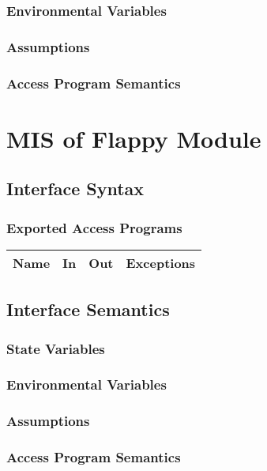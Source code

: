 \documentclass[12pt, titlepage]{article}
\begin{document}
		\subsubsection{Environmental Variables}
		\subsubsection{Assumptions}
		\subsubsection{Access Program Semantics}


\section{MIS of Flappy Module}
	\subsection{Interface Syntax}
		\subsubsection{Exported Access Programs}
		
	\begin{tabular}[pos]{|c|c|c|c|}
	\hline
	\textbf{Name}& \textbf{In} & \textbf{Out} & \textbf{Exceptions} \\ 
	\hline
					
	\end{tabular}		
		
	\subsection{Interface Semantics}
		\subsubsection{State Variables}
		
		\subsubsection{Environmental Variables}
		\subsubsection{Assumptions}
		\subsubsection{Access Program Semantics}
		
\end{document}
